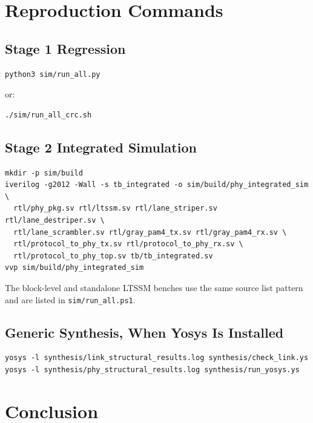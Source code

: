\documentclass[11pt,a4paper]{article}
\newcommand{\code}[1]{\texttt{#1}}
\begin{document}
\section{Reproduction Commands}

\subsection{Stage 1 Regression}
\begin{verbatim}
python3 sim/run_all.py
\end{verbatim}

or:

\begin{verbatim}
./sim/run_all_crc.sh
\end{verbatim}

\subsection{Stage 2 Integrated Simulation}
\begin{verbatim}
mkdir -p sim/build
iverilog -g2012 -Wall -s tb_integrated -o sim/build/phy_integrated_sim \
  rtl/phy_pkg.sv rtl/ltssm.sv rtl/lane_striper.sv rtl/lane_destriper.sv \
  rtl/lane_scrambler.sv rtl/gray_pam4_tx.sv rtl/gray_pam4_rx.sv \
  rtl/protocol_to_phy_tx.sv rtl/protocol_to_phy_rx.sv \
  rtl/protocol_to_phy_top.sv tb/tb_integrated.sv
vvp sim/build/phy_integrated_sim
\end{verbatim}

The block-level and standalone LTSSM benches use the same source list pattern and are listed
in \code{sim/run\_all.ps1}.

\subsection{Generic Synthesis, When Yosys Is Installed}
\begin{verbatim}
yosys -l synthesis/link_structural_results.log synthesis/check_link.ys
yosys -l synthesis/phy_structural_results.log synthesis/run_yosys.ys
\end{verbatim}

\section{Conclusion}
\end{document}
